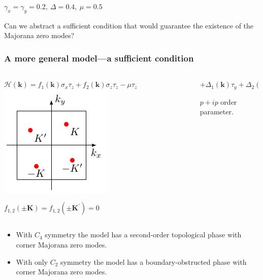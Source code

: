 \documentclass{beamer}
\newcommand{\mc}{\mathcal}
\renewcommand{\(}{\left(}
\renewcommand{\)}{\right)}
\renewcommand{\[}{\left[}
\renewcommand{\]}{\right]}
\begin{document}
\begin{frame}
\begin{center}
        $\gamma_x = \gamma_y = 0.2,\  \Delta = 0.4,\  \mu = 0.5 $
    \end{center}

    \pause
    \begin{framed}
        Can we abstract a sufficient condition that would guarantee the existence of the Majorana zero modes? 
    \end{framed}
\end{frame}

\begin{frame}
    \frametitle{A more general model---a sufficient condition }
    \begin{columns}[t]
        \begin{column}{0.6\textwidth}
            $\mc H(\bm k) = f_1(\bm k) \sigma_x \tau_z + f_2(\bm k) \sigma_z \tau_z -\mu \tau_z $
            \centering
            \includegraphics[]{normal_stateBZ.pdf}

            $f_{1,2}(\pm \bm K) = f_{1,2}(\pm \bm K^\prime) =  0$
        \end{column}
        \begin{column}{0.4\textwidth}
            $+ \Delta_1(\bm k) \tau_y + \Delta_2(\bm k) \tau_x$

            \vspace{20pt}
            $p+ip$ order parameter. 
        \end{column}
    \end{columns}\pause
    \begin{framed}
        \begin{itemize}
            \item With $C_4$ symmetry the model has a second-order topological phase with corner Majorana zero modes. 
            \item With only $C_2$ symmetry the model has a boundary-obstructed phase with corner Majorana zero modes.
        \end{itemize}
    \end{framed}
\end{frame}
\end{document}
